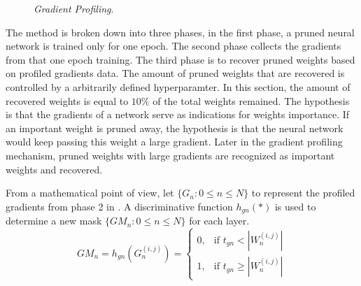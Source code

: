 \documentclass[a4paper,12pt]{report}
\begin{document}
\begin{figure}[!h]
  \centering
  \caption{\textit{Gradient Profiling}.}
  \label{fig:gp_mech}
\end{figure}
The method is broken down into three phases, in the first phase, a pruned neural
network is trained only for one epoch.
The second phase collects the gradients from that one epoch training.
The third phase is to recover pruned weights based on profiled gradients data.
The amount of pruned weights that are recovered is controlled by a arbitrarily defined
hyperparamter.
In this section, the amount of recovered weights is equal to $10\%$ of the
total weights remained.
The hypothesis is that the gradients of a network serve as indications for
weights importance.
If an important weight is pruned away, the hypothesis is that the neural
network would keep passing this weight a large gradient.
Later in the gradient profiling mechanism, pruned weights with large gradients
are recognized as important weights and recovered.

From a mathematical point of view, let $\{G_n: 0 \leq n \leq N\}$ to represent the
profiled gradients from phase 2 in .
A discriminative function $h_{gn}(*)$ is used to determine a new mask $\{GM_{n}: 0 \leq n \leq N\}$
for each layer.
\begin{equation}
  GM_n = h_{gn}(G_n^{(i,j)}) =
  \begin{cases}
    0, &\text{if } t_{gn} < |W_n^{(i,j)}| \\
    1, &\text{if } t_{gn} \geq |W_n^{(i,j)}|
  \end{cases}
  \label{equ:gmfunc}
\end{equation}
\end{document}
